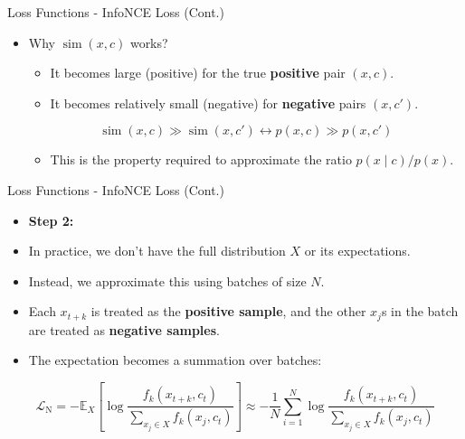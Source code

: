 \documentclass[serif, aspectratio=169]{beamer}
\begin{document}
\begin{frame}{Loss Functions - InfoNCE Loss (Cont.)}
    \begin{itemize}
        \item Why $\operatorname{sim}\left(x, c \right)$ works?

        \begin{itemize}
            \item It becomes large (positive) for the true \textbf{positive} pair $\left(x,c\right)$.
            \item It becomes relatively small (negative) for \textbf{negative} pairs $\left(x,c'\right)$.
        \end{itemize}

        \begin{equation*}
            \operatorname{sim}\left(x, c \right) \gg \operatorname{sim}\left(x, c' \right) \longleftrightarrow
            p\left(x, c \right) \gg p\left(x, c' \right)
        \end{equation*}

        \begin{itemize}
            \item This is the property required to approximate the ratio $p\left(x \mid c\right)/p\left(x\right)$.
        \end{itemize}
    \end{itemize}
\end{frame}


\begin{frame}{Loss Functions - InfoNCE Loss (Cont.)}
    \begin{itemize}
        \item \textbf{Step 2:}
        \item In practice, we don’t have the full distribution $X$ or its expectations.
        \item Instead, we approximate this using batches of size $N$.
        \item Each $x_{t+k}$ is treated as the \textbf{positive sample}, and the other $x_j$s in the batch are treated as \textbf{negative samples}.
        \item The expectation becomes a summation over batches:
    \end{itemize}

    \begin{equation}
        \mathcal{L}_{\mathrm{N}} =
        -{\mathbb{E}_X}\left[\log \frac{f_k\left(x_{t+k}, c_t\right)}{\sum_{x_j \in X} f_k\left(x_j, c_t\right)}\right] \approx
        -\frac{1}{N} \sum_{i=1}^N\log \frac{f_k\left(x_{t+k}, c_t\right)}{\sum_{x_j \in X} f_k\left(x_j, c_t\right)}
    \end{equation}
\end{frame}
\end{document}

